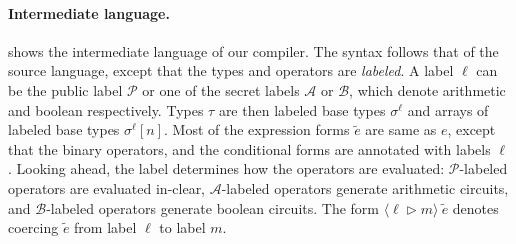 \paragraph{Intermediate language.}  shows the
intermediate language of our compiler. The syntax follows that of the source
language, except that the types and operators are \emph{labeled}. 
A label $\ell$ can be the  public label $\mathcal{P}$ or  one of the secret labels $\mathcal{A}$ or
$\mathcal{B}$, which denote arithmetic and boolean respectively.
Types $\tau$ are then
labeled base types $\sigma^{\ell}$ and arrays of labeled base types
$\sigma^{\ell}[n]$.
Most of the expression forms $\widetilde{e}$ are same as $e$, except
that the binary operators, and the conditional forms
are annotated with labels $\ell$.
Looking ahead, the label determines how the operators are
evaluated: $\mathcal{P}$-labeled operators are evaluated in-clear, $\mathcal{A}$-labeled operators generate arithmetic circuits, and
$\mathcal{B}$-labeled operators generate boolean circuits. The
form $\langle \ell \rhd m \rangle\:\widetilde{e}$ denotes coercing
$\widetilde{e}$ from label $\ell$ to label $m$.

